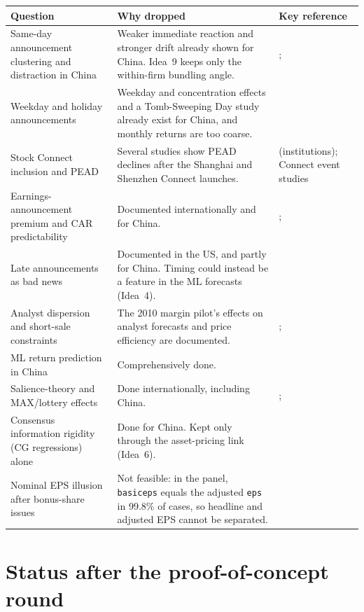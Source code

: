 \documentclass[10pt]{article}
\begin{document}
{\footnotesize
\begin{longtable}{@{}L{6.5cm}L{12.5cm}L{5.5cm}@{}}
\toprule
\textbf{Question} & \textbf{Why dropped} & \textbf{Key reference}\\
\midrule
\endhead
Same-day announcement clustering and distraction in China & Weaker immediate reaction and stronger drift already
shown for China. Idea~9 keeps only the within-firm bundling angle. & \citet{you2011}; \citet{shu2022}\\
Weekday and holiday announcements & Weekday and concentration effects and a Tomb-Sweeping Day study already exist
for China, and monthly returns are too coarse. & \citet{you2011}\\
Stock Connect inclusion and PEAD & Several studies show PEAD declines after the Shanghai and Shenzhen Connect
launches. & \citet{cai2021} (institutions); Connect event studies\\
Earnings-announcement premium and CAR predictability & Documented internationally and for China. &
\citet{barber2013}; \citet{sun2023}\\
Late announcements as bad news & Documented in the US, and partly for China. Timing could instead be a feature in
the ML forecasts (Idea~4). & \citet{wang2008}\\
Analyst dispersion and short-sale constraints & The 2010 margin pilot's effects on analyst forecasts and price
efficiency are documented. & \citet{chang2014}; \citet{li2019short}\\
ML return prediction in China & Comprehensively done. & \citet{leippold2022}\\
Salience-theory and MAX/lottery effects & Done internationally, including China. & \citet{cakici2022};
\citet{nartea2017}\\
Consensus information rigidity (CG regressions) alone & Done for China. Kept only through the asset-pricing link
(Idea~6). & \citet{lili2025}\\
Nominal EPS illusion after bonus-share issues & Not feasible: in the panel, \texttt{basiceps} equals the adjusted
\texttt{eps} in 99.8\% of cases, so headline and adjusted EPS cannot be separated. & \citet{shue2021}\\
\bottomrule
\end{longtable}
}

\section*{Status after the proof-of-concept round}
\end{document}
